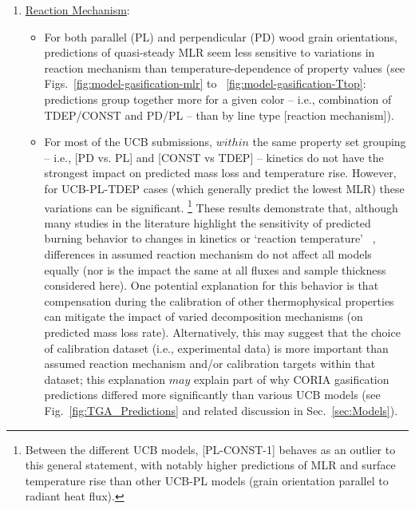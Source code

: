 \documentclass{article}
\begin{document}
\begin{enumerate}[]
	\item \underline{Reaction Mechanism}: 
	\begin{itemize}
		\item For both parallel (PL) and perpendicular (PD) wood grain orientations, predictions of quasi-steady MLR seem less sensitive to variations in reaction mechanism than temperature-dependence of property values (see Figs.~\ref{fig:model-gasification-mlr} to ~\ref{fig:model-gasification-Ttop}: predictions group together more for a given color -- i.e., combination of TDEP/CONST and PD/PL -- than by line type [reaction mechanism]).
		\item For most of the UCB submissions, $within$ the same property set grouping -- i.e., [PD vs. PL] and [CONST vs TDEP] -- kinetics do not have the strongest impact on predicted mass loss and temperature rise. However, for UCB-PL-TDEP cases (which generally predict the lowest MLR) these variations can be significant. \footnote{Between the different UCB models, [PL-CONST-1] behaves as an outlier to this general statement, with notably higher predictions of MLR and surface temperature rise than other UCB-PL models (grain orientation parallel to radiant heat flux).} These results demonstrate that, although many studies in the literature highlight the sensitivity of predicted burning behavior to changes in kinetics or `reaction temperature' ~\cite{ding2023analysis,stoliarov2009effect, Linteris?},	differences in assumed reaction mechanism do not affect all models equally (nor is the impact the same at all fluxes and sample thickness considered here). One potential explanation for this behavior is that compensation during the calibration of other thermophysical properties can mitigate the impact of varied decomposition mechanisms (on predicted mass loss rate). Alternatively, this may suggest that the choice of calibration dataset (i.e., experimental data) is more important than assumed reaction mechanism and/or calibration targets within that dataset; this explanation $may$ explain part of why CORIA gasification predictions differed more significantly than various UCB models (see Fig.~\ref{fig:TGA_Predictions} and related discussion in Sec.~\ref{sec:Models}). %
	\end{itemize}
	
\end{enumerate}	
\end{document}
